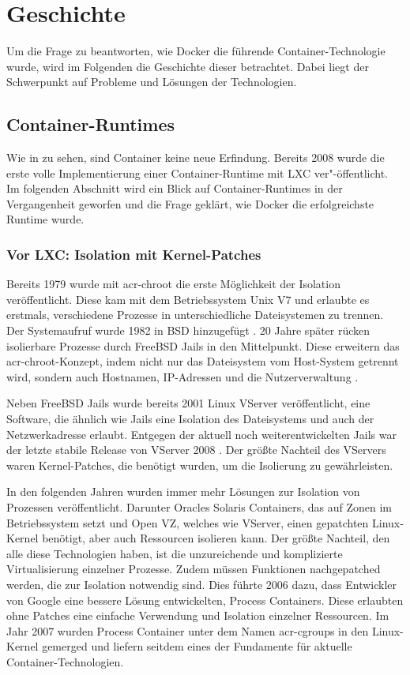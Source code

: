 \chapter{Geschichte}
\label{chap:geschichte}
Um die Frage zu beantworten, wie Docker die führende Container-Technologie wurde, wird im Folgenden die Geschichte dieser betrachtet. Dabei liegt der Schwerpunkt auf Probleme und Lösungen der Technologien.
 
\section{Container-Runtimes}
\label{sec:lxc2containerd}
Wie in  zu sehen, sind Container keine neue Erfindung. Bereits 2008 wurde die erste volle Implementierung einer Container-Runtime mit LXC ver"-öffentlicht. Im folgenden Abschnitt wird ein Blick auf Container-Runtimes in der Vergangenheit geworfen und die Frage geklärt, wie Docker die erfolgreichste Runtime wurde.

\subsection{Vor LXC: Isolation mit Kernel-Patches}
\label{sec:geschichteVorLXC}

Bereits 1979 wurde mit \gls{acr-chroot} die erste Möglichkeit der Isolation veröffentlicht. Diese kam mit dem Betriebssystem Unix V7 und erlaubte es erstmals, verschiedene Prozesse in unterschiedliche Dateisystemen zu trennen. Der Systemaufruf wurde 1982 in BSD hinzugefügt \citep{ABriefHistoryofContainers:fromthe1970sto2017}. 20 Jahre später rücken isolierbare Prozesse durch FreeBSD Jails in den Mittelpunkt. Diese erweitern das \Gls{acr-chroot}-Konzept, indem nicht nur das Dateisystem vom Host-System getrennt wird, sondern auch Hostnamen, IP-Adressen und die Nutzerverwaltung \citep{FreeBSDHandbook}. 

Neben FreeBSD Jails wurde bereits 2001 Linux VServer veröffentlicht, eine Software, die ähnlich wie Jails eine Isolation des Dateisystems und auch der Netzwerkadresse erlaubt. Entgegen der aktuell noch weiterentwickelten Jails war der letzte stabile Release von VServer 2008 \citep{PaperLinuxVServer}. Der größte Nachteil des VServers waren Kernel-Patches, die benötigt wurden, um die Isolierung zu gewährleisten.

In den folgenden Jahren wurden immer mehr Lösungen zur Isolation von Prozessen veröffentlicht. Darunter Oracles Solaris Containers, das auf Zonen im Betriebssystem setzt und Open VZ, welches wie VServer, einen gepatchten Linux-Kernel benötigt, aber auch Ressourcen isolieren kann. Der größte Nachteil, den alle diese Technologien haben, ist die unzureichende und komplizierte Virtualisierung einzelner Prozesse. Zudem müssen Funktionen nachgepatched werden, die zur Isolation notwendig sind. Dies führte 2006 dazu, dass Entwickler von Google eine bessere Lösung entwickelten, Process Containers. Diese erlaubten ohne Patches eine einfache Verwendung und Isolation einzelner Ressourcen. Im Jahr 2007 wurden Process Container unter dem Namen \glspl{acr-cgroup} in den Linux-Kernel gemerged und liefern seitdem eines der Fundamente für aktuelle Container-Technologien.

